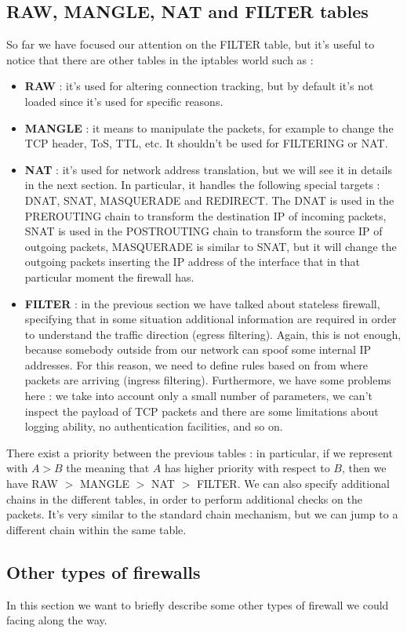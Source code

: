 \documentclass[11pt]{article}
\begin{document}
\subsection{RAW, MANGLE, NAT and FILTER tables}
So far we have focused our attention on the FILTER table, but it's useful to notice that there are other tables in the iptables world such as :
\begin{itemize}
\item \textbf{RAW} : it's used for altering connection tracking, but by default it's not loaded since it's used for specific reasons.
\item \textbf{MANGLE} : it means to manipulate the packets, for example to change the TCP header, ToS, TTL, etc. It shouldn't be used for FILTERING or NAT.
\item \textbf{NAT} : it's used for network address translation, but we will see it in details in the next section. In particular, it handles the following special targets : DNAT, SNAT, MASQUERADE and REDIRECT. The DNAT is used in the PREROUTING chain to transform the destination IP of incoming packets, SNAT is used in the POSTROUTING chain to transform the source IP of outgoing packets, MASQUERADE is similar to SNAT, but it will change the outgoing packets inserting the IP address of the interface that in that particular moment the firewall has.
\item \textbf{FILTER} : in the previous section we have talked about stateless firewall, specifying that in some situation additional information are required in order to understand the traffic direction (egress filtering). Again, this is not enough, because somebody outside from our network can spoof some internal IP addresses. For this reason, we need to define rules based on from where packets are arriving (ingress filtering). Furthermore, we have some problems here :  we take into account only a small number of parameters, we can't inspect the payload of TCP packets and there are some limitations about logging ability, no authentication facilities, and so on.
\end{itemize}
There exist a priority between the previous tables : in particular, if we represent with $A > B$ the meaning that $A$ has higher priority with respect to $B$, then we have RAW $>$ MANGLE $>$ NAT $>$ FILTER. We can also specify additional chains in the different tables, in order to perform additional checks on the packets. It's very similar to the standard chain mechanism, but we can jump to a different chain within the same table.
\subsection{Other types of firewalls}
In this section we want to briefly describe some other types of firewall we could facing along the way.
\end{document}
